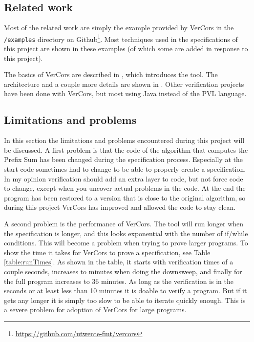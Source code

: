 \documentclass[a4paper]{article}
\newcommand{\code}[1]{\texttt{\small \color{inline}#1}} %
\begin{document}
\subsection{Related work}
Most of the related work are simply the example provided by VerCors in the \code{/examples} directory on Github\footnote{\url{https://github.com/utwente-fmt/vercors}}. Most techniques used in the specifications of this project are shown in these examples (of which some are added in response to this project).

The basics of VerCors are described in \cite{blom2014vercors}, which introduces the tool. The architecture and a couple more details are shown in \cite{amighi2012vercors}. Other verification projects have been done with VerCors, but most using Java instead of the PVL language.

\subsection{Limitations and problems}
In this section the limitations and problems encountered during this project will be discussed. A first problem is that the code of the algorithm that computes the Prefix Sum has been changed during the specification process. Especially at the start code sometimes had to change to be able to properly create a specification. In my opinion verification should add an extra layer to code, but not force code to change, except when you uncover actual problems in the code. At the end the program has been restored to a version that is close to the original algorithm, so during this project VerCors has improved and allowed the code to stay clean.

A second problem is the performance of VerCors. The tool will run longer when the specification is longer, and this looks exponential with the number of if/while conditions. This will become a problem when trying to prove larger programs. To show the time it takes for VerCors to prove a specification, see Table \ref{table:runTimes}. As shown in the table, it starts with verification times of a couple seconds, increases to minutes when doing the downsweep, and finally for the full program increases to 36 minutes. As long as the verification is in the seconds or at least less than 10 minutes it is doable to verify a program. But if it gets any longer it is simply too slow to be able to iterate quickly enough. This is a severe problem for adoption of VerCors for large programs.
\end{document}
